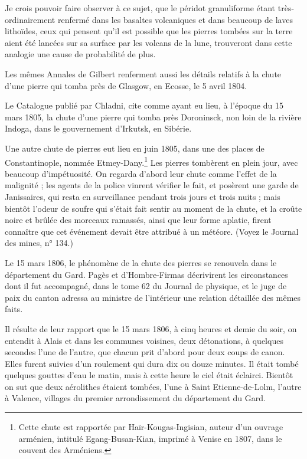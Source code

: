 \documentclass[a4paper, 12pt, oneside, french]{article}
\begin{document}
Je crois pouvoir faire observer à ce sujet, que le péridot granuliforme étant très-ordinairement renfermé dans les basaltes volcaniques et dans beaucoup de laves lithoïdes, ceux qui pensent qu'il est possible que les pierres tombées sur la terre aient été lancées sur sa surface par les volcans de la lune, trouveront dans cette analogie une cause de probabilité de plus.

Les mêmes Annales de Gilbert renferment aussi les détails relatifs à la chute d'une pierre qui tomba près de Glasgow, en Ecosse, le 5 avril 1804.

Le Catalogue publié par Chladni, cite comme ayant eu lieu, à l'époque du 15 mars 1805, la chute d'une pierre qui tomba près Doroninsck, non loin de la rivière Indoga, dans le gouvernement d'Irkutsk, en Sibérie.

Une autre chute de pierres eut lieu en juin 1805, dans une des places de Constantinople, nommée Etmey-Dany.\footnote{Cette chute est rapportée par Haïr-Kougas-Ingisian, auteur d'un ouvrage arménien, intitulé Egang-Busan-Kian, imprimé à Venise en 1807, dans le couvent des Arméniens.} Les pierres tombèrent en plein jour, avec beaucoup d'impétuosité. On regarda d'abord leur chute comme l'effet de la malignité ; les agents de la police vinrent vérifier le fait, et posèrent une garde de Janissaires, qui resta en surveillance pendant trois jours et trois nuits ; mais bientôt l'odeur de soufre qui s'était fait sentir au moment de la chute, et la croûte noire et brûlée des morceaux ramassés, ainsi que leur forme aplatie, firent connaître que cet événement devait être attribué à un météore. (Voyez le Journal des mines, n° 134.)

Le 15 mars 1806, le phénomène de la chute des pierres se renouvela dans le département du Gard. Pagès et d'Hombre-Firmas décrivirent les circonstances dont il fut accompagné, dans le tome 62 du Journal de physique, et le juge de paix du canton adressa au ministre de l'intérieur une relation détaillée des mêmes faits.

Il résulte de leur rapport que le 15 mars 1806, à cinq heures et demie du soir, on entendit à Alais et dans les communes voisines, deux détonations, à quelques secondes l'une de l'autre, que chacun prit d'abord pour deux coups de canon. Elles furent suivies d'un roulement qui dura dix ou douze minutes. Il était tombé quelques gouttes d'eau le matin, mais à cette heure le ciel était éclairci. Bientôt on sut que deux aérolithes étaient tombées, l'une à Saint Etienne-de-Lolm, l'autre à Valence, villages du premier arrondissement du département du Gard.
\end{document}

